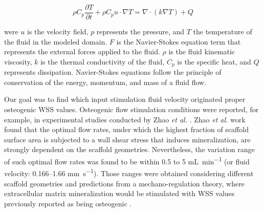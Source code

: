 \begin{equation}
\label{NS3}
\rho C_p \frac{\partial T}{\partial t} + \rho C_p u \cdot \nabla T = \nabla \cdot (k \nabla T) + Q
\end{equation}

\noindent were $u$ is the velocity field, $p$ represents the pressure, and $T$ the temperature of the fluid in the modeled domain. $F$ is the Navier-Stokes equation term that represents the external forces applied to the fluid. $\rho$ is the fluid kinematic viscosity, $k$ is the thermal conductivity of the fluid, $C_p$ is the specific heat, and $Q$ represents dissipation. Navier-Stokes equations follow the principle of conservation of the energy, momentum, and mass of a fluid flow. 

Our goal was to find which input stimulation fluid velocity originated proper osteogenic \ac{WSS} values. Osteogenic flow stimulation conditions were reported, for example, in experimental studies conducted by Zhao \textit{et al.} \cite{Zhao2018-ci}. Zhao \textit{et al.} work found that the optimal flow rates, under which the highest fraction of scaffold surface area is subjected to a wall shear stress that induces mineralization, are strongly dependent on the scaffold geometries. Nevertheless, the variation range of such optimal flow rates was found to be within 0.5 to 5 \si{\milli\liter\per\minute} (or fluid velocity: 0.166--1.66 \si{\milli\meter\per\second}). Those ranges were obtained considering different scaffold geometries and predictions from a mechano-regulation theory, where extracellular matrix mineralization would be stimulated with \ac{WSS} values previously reported as being osteogenic \cite{Zhao2018-ci}.

